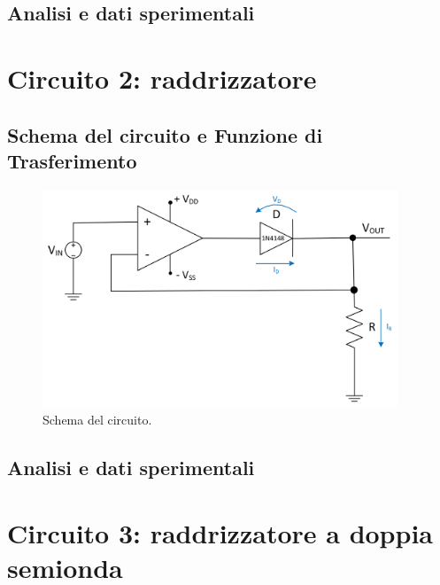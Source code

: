 \documentclass{report}
\begin{document}
\subsection{Analisi e dati sperimentali}

\newpage
\section{Circuito 2: raddrizzatore}
\subsection{Schema del circuito e Funzione di Trasferimento}
\begin{figure}[h]
	\centering
	\includegraphics[height=6.5cm]{immagini/schema2}
	\caption{Schema del circuito.}
	\label{figura:schema2}
\end{figure}
\subsection{Analisi e dati sperimentali}

\newpage
\section{Circuito 3: raddrizzatore a doppia semionda}
\end{document}

